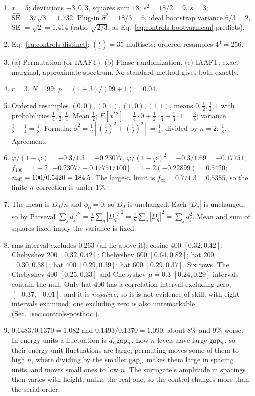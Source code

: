 \begin{enumerate}
\item[1.] $\bar x=5$; deviations $-3,0,3$, squares sum $18$; $s^2=18/2=9$, $s=3$; $\widehat{\mathrm{SE}}=3/\sqrt3=1.732$. Plug-in $\hat\sigma^2=18/3=6$, ideal bootstrap variance $6/3=2$, SE $=\sqrt2=1.414$ (ratio $\sqrt{2/3}$, as Eq.~\eqref{eq:controls-bootvarmean} predicts).
\item[2.] Eq.~\eqref{eq:controls-distinct}: $\binom74=35$ multisets; ordered resamples $4^4=256$.
\item[3.] (a) Permutation (or IAAFT). (b) Phase randomization. (c) IAAFT: exact marginal, approximate spectrum. No standard method gives both exactly.
\item[4.] $r=3$, $N=99$: $p=(1+3)/(99+1)=0.04$.
\item[5.] Ordered resamples $(0,0),(0,1),(1,0),(1,1)$, means $0,\tfrac12,\tfrac12,1$ with probabilities $\tfrac14,\tfrac12,\tfrac14$. Mean $\tfrac12$; $E[\bar x^{*2}]=\tfrac14\cdot0+\tfrac12\cdot\tfrac14+\tfrac14\cdot1=\tfrac38$; variance $\tfrac38-\tfrac14=\tfrac18$. Formula: $\hat\sigma^2=\tfrac12[(\tfrac12)^2+(\tfrac12)^2]=\tfrac14$, divided by $n=2$: $\tfrac18$. Agreement.
\item[7.] $\varphi/(1-\varphi)=-0.3/1.3=-0.23077$, $\varphi/(1-\varphi)^2=-0.3/1.69=-0.17751$; $f_{100}=1+2[-0.23077+0.17751/100]=1+2(-0.22899)=0.5420$; $n_{\rm eff}=100/0.5420=184.5$. The large-$n$ limit is $f_\infty=0.7/1.3=0.5385$, so the finite-$n$ correction is under $1\%$.
\item[9.] The mean is $D_0/n$ and $\phi_0=0$, so $D_0$ is unchanged. Each $|D_q|$ is unchanged, so by Parseval $\sum_jd_j'^2=\frac1n\sum_q|D_q'|^2=\frac1n\sum_q|D_q|^2=\sum_jd_j^2$. Mean and sum of squares fixed imply the variance is fixed.
\item[11.] rms interval excludes $0.263$ (all lie above it): cosine 400 $[0.32,0.42]$; Chebyshev 200 $[0.32,0.42]$; Chebyshev 600 $[0.64,0.82]$; hat 200 $[0.30,0.38]$; hat 400 $[0.29,0.39]$; hat 600 $[0.29,0.37]$. Six rows. The Chebyshev 400 $[0.25,0.33]$ and Chebyshev $\mu=0.3$ $[0.24,0.29]$ intervals contain the null. Only hat 400 has a correlation interval excluding zero, $[-0.37,-0.01]$, and it is \emph{negative}, so it is not evidence of skill; with eight intervals examined, one excluding zero is also unremarkable (Sec.~\ref{sec:controls-posthoc}).
\item[13.] $0.1483/0.1370=1.082$ and $0.1493/0.1370=1.090$: about $8\%$ and $9\%$ worse. In energy units a fluctuation is $d_n\mathrm{gap}_n$. Low-$n$ levels have large $\mathrm{gap}_n$, so their energy-unit fluctuations are large; permuting moves some of them to high $n$, where dividing by the smaller $\mathrm{gap}_n$ makes them large in spacing units, and moves small ones to low $n$. The surrogate's amplitude in spacings then varies with height, unlike the real one, so the control changes more than the serial order.

\end{enumerate}
